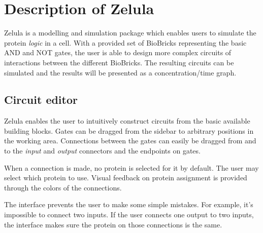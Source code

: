 

\newcommand{\screenshotScale}{1.4}



\section{Description of Zelula}
Zelula is a modelling and simulation package which enables users to simulate the protein \textit{logic} in a cell. With a provided set of BioBricks representing the basic AND and NOT gates, the user is able to design more complex circuits of interactions between the different BioBricks. The resulting circuits can be simulated and the results will be presented as a concentration/time graph.


\subsection{Circuit editor}
\begin{figure}[h!]
\centering{}
\end{figure}

\noindent Zelula enables the user to intuitively construct circuits from the basic available building blocks. Gates can be dragged from the sidebar to arbitrary positions in the working area. Connections between the gates can easily be dragged from and to the \textit{input} and \textit{output} connectors and the endpoints on gates. 

When a connection is made, no protein is selected for it by default. The user may select which protein to use. Visual feedback on protein assignment is provided through the colors of the connections.

The interface prevents the user to make some simple mistakes. For example, it's impossible to connect two inputs. If the user connects one output to two inputs, the interface makes sure the protein on those connections is the same.

